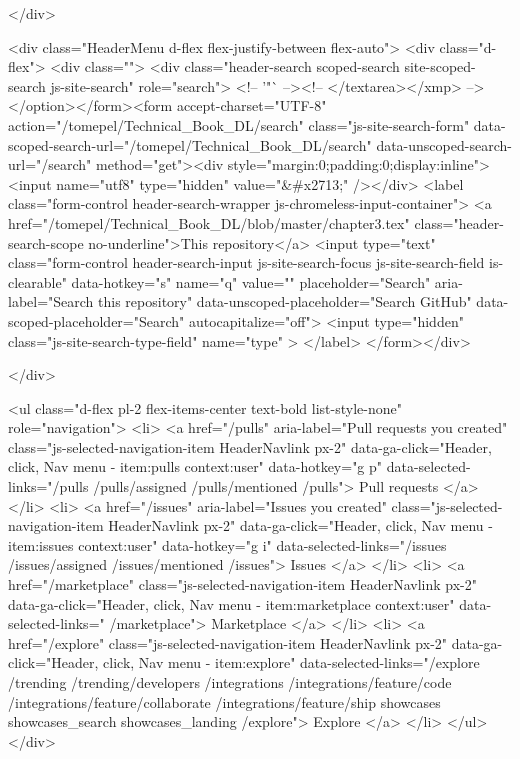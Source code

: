     </div>

    <div class="HeaderMenu d-flex flex-justify-between flex-auto">
      <div class="d-flex">
            <div class="">
              <div class="header-search scoped-search site-scoped-search js-site-search" role="search">
  <!-- '"` --><!-- </textarea></xmp> --></option></form><form accept-charset="UTF-8" action="/tomepel/Technical_Book_DL/search" class="js-site-search-form" data-scoped-search-url="/tomepel/Technical_Book_DL/search" data-unscoped-search-url="/search" method="get"><div style="margin:0;padding:0;display:inline"><input name="utf8" type="hidden" value="&#x2713;" /></div>
    <label class="form-control header-search-wrapper js-chromeless-input-container">
        <a href="/tomepel/Technical_Book_DL/blob/master/chapter3.tex" class="header-search-scope no-underline">This repository</a>
      <input type="text"
        class="form-control header-search-input js-site-search-focus js-site-search-field is-clearable"
        data-hotkey="s"
        name="q"
        value=""
        placeholder="Search"
        aria-label="Search this repository"
        data-unscoped-placeholder="Search GitHub"
        data-scoped-placeholder="Search"
        autocapitalize="off">
        <input type="hidden" class="js-site-search-type-field" name="type" >
    </label>
</form></div>

            </div>

          <ul class="d-flex pl-2 flex-items-center text-bold list-style-none" role="navigation">
            <li>
              <a href="/pulls" aria-label="Pull requests you created" class="js-selected-navigation-item HeaderNavlink px-2" data-ga-click="Header, click, Nav menu - item:pulls context:user" data-hotkey="g p" data-selected-links="/pulls /pulls/assigned /pulls/mentioned /pulls">
                Pull requests
</a>            </li>
            <li>
              <a href="/issues" aria-label="Issues you created" class="js-selected-navigation-item HeaderNavlink px-2" data-ga-click="Header, click, Nav menu - item:issues context:user" data-hotkey="g i" data-selected-links="/issues /issues/assigned /issues/mentioned /issues">
                Issues
</a>            </li>
                <li>
                  <a href="/marketplace" class="js-selected-navigation-item HeaderNavlink px-2" data-ga-click="Header, click, Nav menu - item:marketplace context:user" data-selected-links=" /marketplace">
                    Marketplace
</a>                </li>
            <li>
              <a href="/explore" class="js-selected-navigation-item HeaderNavlink px-2" data-ga-click="Header, click, Nav menu - item:explore" data-selected-links="/explore /trending /trending/developers /integrations /integrations/feature/code /integrations/feature/collaborate /integrations/feature/ship showcases showcases_search showcases_landing /explore">
                Explore
</a>            </li>
          </ul>
      </div>

